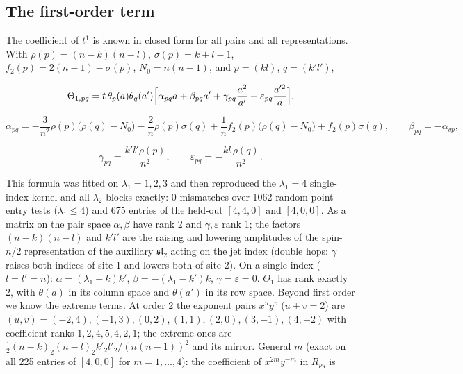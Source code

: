 \documentclass[11pt]{article}
\begin{document}
\subsection{The first-order term}\label{sec:first}

The coefficient of $t^1$ is known in closed form for all pairs and all representations.
With $\rho(p)=(n-k)(n-l)$, $\sigma(p)=k+l-1$, $f_2(p)=2(n-1)-\sigma(p)$, $N_0=n(n-1)$, and $p=(kl)$, $q=(k'l')$,

\begin{equation}
\Theta_{1,pq}=t\,\theta_p(a)\theta_q(a')\Bigl[\alpha_{pq}a+\beta_{pq}a'+\gamma_{pq}\frac{a^2}{a'}+\varepsilon_{pq}\frac{a'^2}{a}\Bigr],\label{eq:first}
\end{equation}

\begin{equation}
\alpha_{pq}=-\frac3{n^2}\rho(p)\bigl(\rho(q)-N_0\bigr)-\frac2n\rho(p)\sigma(q)+\frac1nf_2(p)\bigl(\rho(q)-N_0\bigr)+f_2(p)\sigma(q),\qquad\beta_{pq}=-\alpha_{qp},
\end{equation}

\begin{equation}
\gamma_{pq}=\frac{k'l'\rho(p)}{n^2},\qquad\varepsilon_{pq}=-\frac{kl\,\rho(q)}{n^2}.
\end{equation}

This formula was fitted on $\lambda_1=1,2,3$ and then reproduced the $\lambda_1=4$ single-index kernel and all $\lambda_2$-blocks exactly: 0 mismatches over 1062 random-point entry tests ($\lambda_1\le4$) and 675 entries of the held-out $[4,4,0]$ and $[4,0,0]$. As a matrix on the pair space $\alpha,\beta$ have rank 2 and $\gamma,\varepsilon$ rank 1; the factors $(n-k)(n-l)$ and $k'l'$ are the raising and lowering amplitudes of the spin-$n/2$ representation of the auxiliary $\mathfrak{sl}_2$ acting on the jet index (double hops: $\gamma$ raises both indices of site 1 and lowers both of site 2).
On a single index ($l=l'=n$): $\alpha=(\lambda_1-k)k'$, $\beta=-(\lambda_1-k')k$, $\gamma=\varepsilon=0$. $\Theta_1$ has rank exactly 2, with $\theta(a)$ in its column space and $\theta(a')$ in its row space.
Beyond first order we know the extreme terms.
At order $2$ the exponent pairs $x^uy^v$ ($u+v=2$) are $(u,v)=(-2,4),(-1,3),(0,2),(1,1),(2,0),(3,-1),(4,-2)$ with coefficient ranks $1,2,4,5,4,2,1$; the extreme ones are $\tfrac12(n-k)_2(n-l)_2k'_2l'_2/(n(n-1))^2$ and its mirror.
General $m$ (exact on all 225 entries of $[4,0,0]$ for $m=1,\dots,4$): the coefficient of $x^{2m}y^{-m}$ in $R_{pq}$ is
\end{document}

